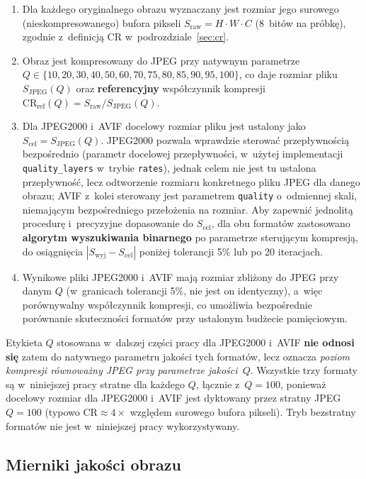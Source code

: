 \documentclass[12pt,a4paper]{article}
\begin{document}
\begin{enumerate}
    \item Dla każdego oryginalnego obrazu wyznaczany jest rozmiar jego surowego (nieskompresowanego) bufora pikseli $S_{\text{raw}} = H \cdot W \cdot C$ (8~bitów na próbkę), zgodnie z~definicją CR w~podrozdziale~\ref{sec:cr}.
    \item Obraz jest kompresowany do JPEG przy natywnym parametrze $Q \in \{10, 20, 30, 40, 50, 60, 70, 75, 80, 85, 90, 95, 100\}$, co daje rozmiar pliku $S_{\text{JPEG}}(Q)$ oraz \textbf{referencyjny} współczynnik kompresji $\mathrm{CR}_{\text{ref}}(Q) = S_{\text{raw}} / S_{\text{JPEG}}(Q)$.
    \item Dla JPEG2000 i~AVIF docelowy rozmiar pliku jest ustalony jako $S_{\text{cel}} = S_{\text{JPEG}}(Q)$. JPEG2000 pozwala wprawdzie sterować przepływnością bezpośrednio (parametr docelowej przepływności, w~użytej implementacji \texttt{quality\_layers} w~trybie \texttt{rates}), jednak celem nie jest tu ustalona przepływność, lecz odtworzenie rozmiaru konkretnego pliku JPEG dla danego obrazu; AVIF z~kolei sterowany jest parametrem \texttt{quality} o~odmiennej skali, niemającym bezpośredniego przełożenia na rozmiar. Aby zapewnić jednolitą procedurę i~precyzyjne dopasowanie do $S_{\text{cel}}$, dla obu formatów zastosowano \textbf{algorytm wyszukiwania binarnego} po parametrze sterującym kompresją, do osiągnięcia $|S_{\text{wyj}} - S_{\text{cel}}|$ poniżej tolerancji 5\% lub po 20 iteracjach.
    \item Wynikowe pliki JPEG2000 i~AVIF mają rozmiar zbliżony do JPEG przy danym $Q$ (w~granicach tolerancji 5\%, nie jest on identyczny), a~więc porównywalny współczynnik kompresji, co umożliwia bezpośrednie porównanie skuteczności formatów przy ustalonym budżecie pamięciowym.
\end{enumerate}

Etykieta $Q$ stosowana w~dalszej części pracy dla JPEG2000 i~AVIF \textbf{nie odnosi się} zatem do natywnego parametru jakości tych formatów, lecz oznacza \textit{poziom kompresji równoważny JPEG przy parametrze jakości~$Q$}. Wszystkie trzy formaty są w~niniejszej pracy stratne dla każdego $Q$, łącznie z~$Q = 100$, ponieważ docelowy rozmiar dla JPEG2000 i~AVIF jest dyktowany przez stratny JPEG~$Q=100$ (typowo $\mathrm{CR} \approx 4\times$ względem surowego bufora pikseli). Tryb bezstratny formatów nie jest w~niniejszej pracy wykorzystywany.

\subsection{Mierniki jakości obrazu}
\end{document}

